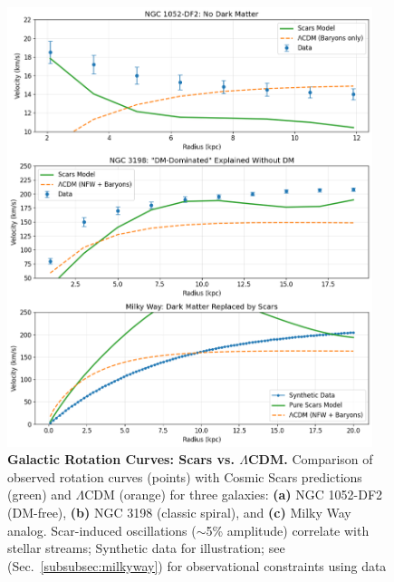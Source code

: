 \documentclass{article}
\begin{document}
\begin{figure}[H]
  \centering
  \includegraphics[width=0.95\textwidth]{figures/three_galaxies_with_LCDM.png}
  \caption{
    \textbf{Galactic Rotation Curves: Scars vs. $\Lambda$CDM.}
    Comparison of observed rotation curves (points) with Cosmic Scars predictions (green) and $\Lambda$CDM (orange) for three galaxies:
    \textbf{(a)} NGC 1052-DF2 (DM-free), 
    \textbf{(b)} NGC 3198 (classic spiral), and 
    \textbf{(c)} Milky Way analog. Scar-induced oscillations ($\sim$5\% amplitude) correlate with stellar streams; Synthetic data for illustration; see (Sec.~\ref{subsubsec:milkyway}) for observational constraints using \citet{Eilers2019} data
  }
  \label{fig:rotation_curves}
\end{figure}
\end{document}
